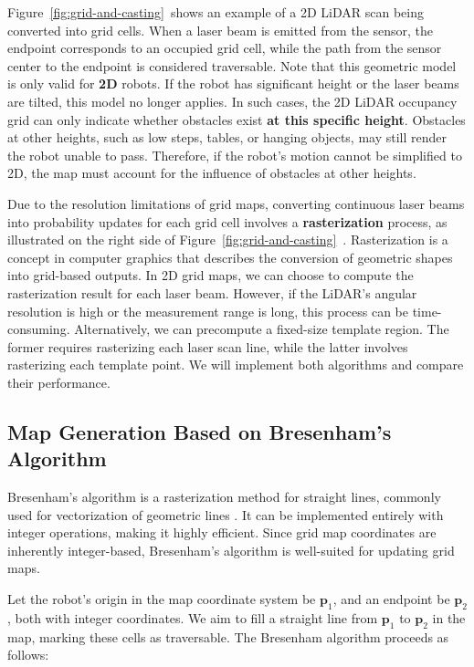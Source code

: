 Figure~\ref{fig:grid-and-casting}~shows an example of a 2D LiDAR scan being converted into grid cells. When a laser beam is emitted from the sensor, the endpoint corresponds to an occupied grid cell, while the path from the sensor center to the endpoint is considered traversable. Note that this geometric model is only valid for \textbf{2D} robots. If the robot has significant height or the laser beams are tilted, this model no longer applies. In such cases, the 2D LiDAR occupancy grid can only indicate whether obstacles exist \textbf{at this specific height}. Obstacles at other heights, such as low steps, tables, or hanging objects, may still render the robot unable to pass. Therefore, if the robot's motion cannot be simplified to 2D, the map must account for the influence of obstacles at other heights.  

Due to the resolution limitations of grid maps, converting continuous laser beams into probability updates for each grid cell involves a \textbf{rasterization} process, as illustrated on the right side of Figure~\ref{fig:grid-and-casting}~. Rasterization is a concept in computer graphics that describes the conversion of geometric shapes into grid-based outputs. In 2D grid maps, we can choose to compute the rasterization result for each laser beam. However, if the LiDAR's angular resolution is high or the measurement range is long, this process can be time-consuming. Alternatively, we can precompute a fixed-size template region. The former requires rasterizing each laser scan line, while the latter involves rasterizing each template point. We will implement both algorithms and compare their performance.

\subsection{Map Generation Based on Bresenham's Algorithm}  
Bresenham's algorithm is a rasterization method for straight lines, commonly used for vectorization of geometric lines \cite{Cohen-Or1997}. It can be implemented entirely with integer operations, making it highly efficient. Since grid map coordinates are inherently integer-based, Bresenham's algorithm is well-suited for updating grid maps.  

Let the robot's origin in the map coordinate system be $\mathbf{p}_1$, and an endpoint be $\mathbf{p}_2$, both with integer coordinates. We aim to fill a straight line from $\mathbf{p}_1$ to $\mathbf{p}_2$ in the map, marking these cells as traversable. The Bresenham algorithm proceeds as follows:  

